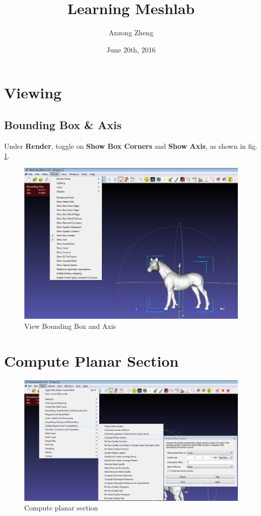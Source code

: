 \documentclass[10pt,a4paper]{article}
\begin{document}
\author{Anzong Zheng}
\title{Learning Meshlab}
\date{June 20th, 2016}
\maketitle
\newpage

\section{Viewing}
\subsection{Bounding Box \& Axis}
Under \textbf{Render}, toggle on \textbf{Show Box Corners} and \textbf{Show Axis}, as shown in fig. \ref{fig:view_boundingBox_axis}.

\begin{figure}[h]
\centering
\includegraphics[width=0.7\linewidth]{view_boundingBox_axis}
\caption{View Bounding Box and Axis}
\label{fig:view_boundingBox_axis}
\end{figure}

\section{Compute Planar Section}
\begin{figure}[h]
\centering
\includegraphics[width=0.7\linewidth]{compute_planar_section}
\caption{Compute planar section}
\label{fig:compute_planar_section}
\end{figure}
\end{document}
